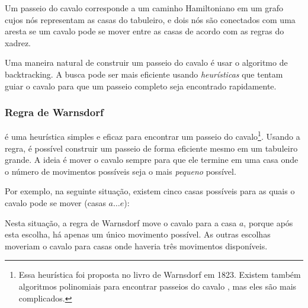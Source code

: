 Um passeio do cavalo corresponde a um caminho Hamiltoniano em um grafo
cujos nós representam as casas do tabuleiro,
e dois nós são conectados com uma aresta se um cavalo
pode se mover entre as casas de acordo com as regras do xadrez.

Uma maneira natural de construir um passeio do cavalo é usar o algoritmo de backtracking.
A busca pode ser mais eficiente usando
\emph{heurísticas} que tentam guiar o cavalo para que
um passeio completo seja encontrado rapidamente.

\subsubsection{Regra de Warnsdorf}


 é uma heurística simples e eficaz
para encontrar um passeio do cavalo\footnote{Essa heurística foi proposta
no livro de Warnsdorf \cite{war23} em 1823. Existem
também algoritmos polinomiais para encontrar passeios do cavalo
\cite{par97}, mas eles são mais complicados.}.
Usando a regra, é possível construir um passeio de forma eficiente
mesmo em um tabuleiro grande.
A ideia é mover o cavalo sempre para que ele termine
em uma casa onde o número de movimentos possíveis seja o mais
\emph{pequeno} possível.

Por exemplo, na seguinte situação, existem cinco
casas possíveis para as quais o cavalo pode se mover (casas $a \ldots e$):
\begin{center}
\end{center}
Nesta situação, a regra de Warnsdorf move o cavalo para a casa $a$,
porque após esta escolha, há apenas um único movimento possível.
As outras escolhas moveriam o cavalo para casas onde
haveria três movimentos disponíveis.


